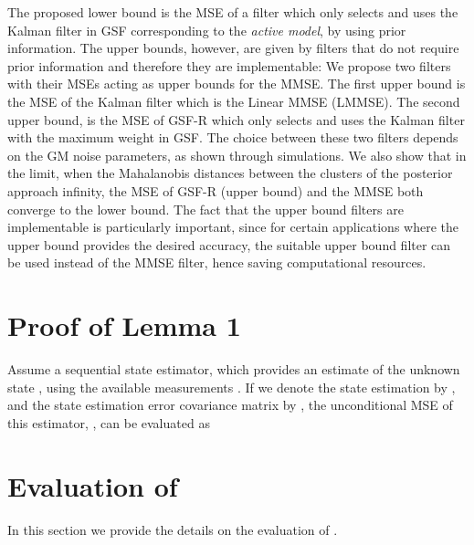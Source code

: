 \documentclass[10pt,twocolumn,twoside]{IEEEtran}
\newcommand{\corcol}[1]{\textcolor{CorCol}{#1}}
\begin{document}
The proposed lower bound is the MSE of a filter which only selects and uses the Kalman filter in GSF corresponding to the \textit{active model}, by using prior information. The upper bounds, however, are given by filters that do not require prior information and therefore they are implementable: We propose two filters with their MSEs acting as upper bounds for the MMSE. The first upper bound is the MSE of \corcol{the }Kalman filter which is the Linear MMSE (LMMSE). The second upper bound, is the MSE of GSF-R which only selects and uses the Kalman filter with the maximum weight in GSF. The choice between these two filters depends on the GM noise parameters, as shown through simulations. We also show that in the limit, when the Mahalanobis distances between the clusters of the posterior approach infinity, the MSE of GSF-R (upper bound) and the MMSE both converge to the lower bound. The fact that the upper bound filters are implementable is particularly important, since for  certain applications where the upper bound provides the desired accuracy, the suitable upper bound filter can be used instead of the MMSE filter, hence saving computational resources. 


















\appendices



\section{Proof of Lemma 1}
\label{sec:uncondMSEProof}
\begin{IEEEproof} Assume a sequential state estimator, which provides an estimate of the unknown state , using the available measurements . If we denote the state estimation by , and the state estimation error covariance matrix by , the unconditional MSE of this estimator, , can be evaluated as
\corcol{
}
\end{IEEEproof} 

\section{Evaluation of }
\label{sec:MUB}
In this section we provide the details on the evaluation of .
\end{document}

